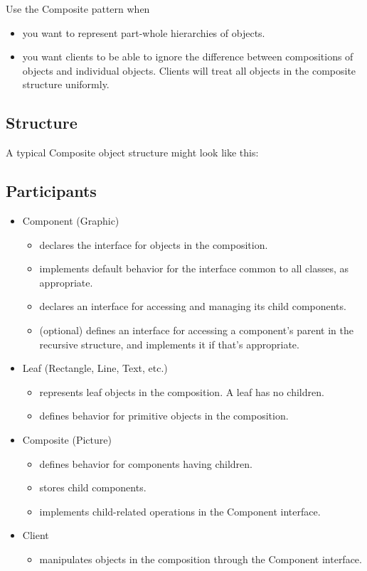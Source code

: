 Use the Composite pattern when
\begin{itemize}
    \item you want to represent part-whole hierarchies of objects.
    \item you want clients to be able to ignore the difference between compositions of objects and individual objects. Clients will treat all objects in the composite structure uniformly.
\end{itemize}

\subsection*{Structure}

A typical Composite object structure might look like this:

\subsection*{Participants}

\begin{itemize}
    \item Component (Graphic)
    \begin{itemize}
        \item declares the interface for objects in the composition.
        \item implements default behavior for the interface common to all classes, as appropriate.
        \item declares an interface for accessing and managing its child components.
        \item (optional) defines an interface for accessing a component's parent in the recursive structure, and implements it if that's appropriate.
    \end{itemize}
    \item Leaf (Rectangle, Line, Text, etc.)
    \begin{itemize}
        \item represents leaf objects in the composition. A leaf has no children.
        \item defines behavior for primitive objects in the composition.
    \end{itemize}
    \item Composite (Picture)
    \begin{itemize}
        \item defines behavior for components having children.
        \item stores child components.
        \item implements child-related operations in the Component interface.
    \end{itemize}
    \item Client
    \begin{itemize}
        \item manipulates objects in the composition through the Component interface.
    \end{itemize}
\end{itemize}

